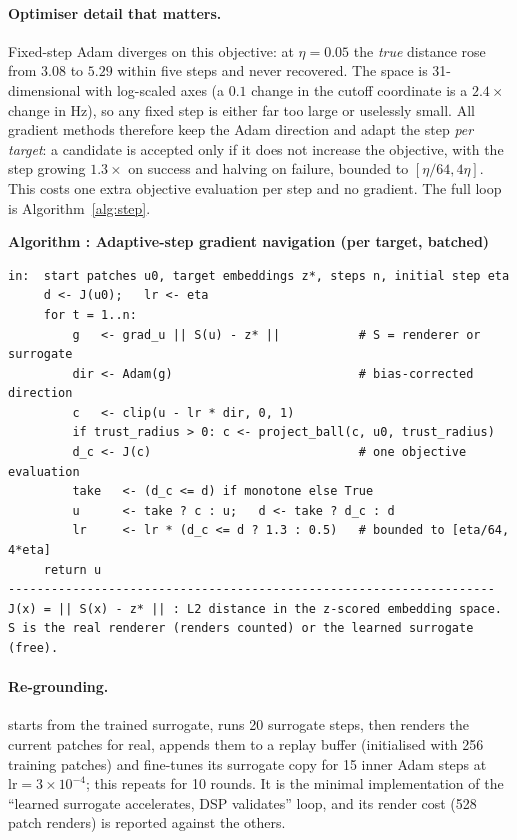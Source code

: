 \documentclass[11pt]{article}
\newcommand{\code}[1]{\texttt{\detokenize{#1}}}
\newcounter{algcounter}
\newenvironment{alg}[1]{\par\medskip\refstepcounter{algcounter}%
  \noindent\textbf{Algorithm \thealgcounter: #1}\par\nopagebreak\small\medskip}%
  {\medskip}
\newcommand{\renGR}{528}
\begin{document}
\paragraph{Optimiser detail that matters.}
Fixed-step Adam diverges on this objective: at $\eta = 0.05$ the \emph{true}
distance rose from $3.08$ to $5.29$ within five steps and never recovered. The
space is 31-dimensional with log-scaled axes (a $0.1$ change in the cutoff
coordinate is a $2.4\times$ change in Hz), so any fixed step is either far too
large or uselessly small. All gradient methods therefore keep the Adam direction
and adapt the step \emph{per target}: a candidate is accepted only if it does
not increase the objective, with the step growing $1.3\times$ on success and
halving on failure, bounded to $[\eta/64, 4\eta]$. This costs one extra
objective evaluation per step and no gradient. The full loop is
Algorithm~\ref{alg:step}.

\begin{alg}{Adaptive-step gradient navigation (per target, batched)}\label{alg:step}
\begin{verbatim}
in:  start patches u0, target embeddings z*, steps n, initial step eta
     d <- J(u0);   lr <- eta
     for t = 1..n:
         g   <- grad_u || S(u) - z* ||           # S = renderer or surrogate
         dir <- Adam(g)                          # bias-corrected direction
         c   <- clip(u - lr * dir, 0, 1)
         if trust_radius > 0: c <- project_ball(c, u0, trust_radius)
         d_c <- J(c)                             # one objective evaluation
         take   <- (d_c <= d) if monotone else True
         u      <- take ? c : u;   d <- take ? d_c : d
         lr     <- lr * (d_c <= d ? 1.3 : 0.5)   # bounded to [eta/64, 4*eta]
     return u
--------------------------------------------------------------------
J(x) = || S(x) - z* || : L2 distance in the z-scored embedding space.
S is the real renderer (renders counted) or the learned surrogate (free).
\end{verbatim}
\end{alg}

\paragraph{Re-grounding.}\label{sec:reground}
\code{grad_reground} starts from the trained surrogate, runs 20 surrogate steps,
then renders the current patches for real, appends them to a replay buffer
(initialised with 256 training patches) and fine-tunes its surrogate copy for 15
inner Adam steps at $\mathrm{lr}=3\times10^{-4}$; this repeats for 10 rounds. It
is the minimal implementation of the ``learned surrogate accelerates, DSP
validates'' loop, and its render cost (\renGR{} patch renders) is reported
against the others.
\end{document}
